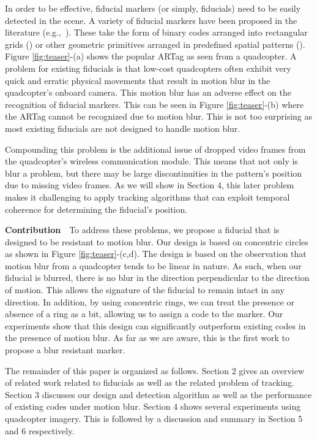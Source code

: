 \documentclass[10pt,twocolumn,letterpaper]{article}
\begin{document}
In order to be effective, fiducial markers (or simply, fiducials) need
to be easily detected in the scene. A variety of fiducial markers
have been proposed in the literature
(e.g.,~\cite{NaimarkF02,ARToolkit02,Fiala05,Pitag13,runetag11}).
These take the form of binary codes arranged into rectangular grids (\cite{ARToolkit02,Fiala05})
or other geometric primitives arranged in predefined spatial patterns
(\cite{NaimarkF02,Pitag13,runetag11}).
Figure \ref{fig:teaser}-(a) shows the popular ARTag \cite{Fiala05} as
seen from a quadcopter. A problem for existing fiducials is that low-cost quadcopters
often exhibit very quick and erratic physical movements that
result in motion blur in the quadcopter's onboard camera. This motion blur has
an adverse effect on the recognition of fiducial markers. This can be seen in
Figure \ref{fig:teaser}-(b) where the ARTag cannot be recognized due to motion
blur. This is not too surprising as most existing fiducials are not
designed to handle motion blur.

Compounding this problem is the additional issue of dropped video frames from
the quadcopter's wireless communication module. This means that not only is
blur a problem, but there may be large discontinuities in the pattern's
position due to missing video frames. As we will show in Section 4, this later problem
makes it challenging to apply tracking algorithms that can exploit temporal
coherence for determining the fiducial's position.

\noindent\textbf{Contribution}~~To address these problems, we propose a
fiducial that is designed to be resistant to motion blur. Our design is based on
concentric circles as shown in Figure \ref{fig:teaser}-(c,d). The design is based
on the observation that motion blur from a quadcopter tends to be linear in
nature. As such, when our fiducial is blurred, there is no blur in the direction
perpendicular to the direction of motion.  This allows the signature of the
fiducial to remain intact in any direction. In addition, by using concentric
rings, we can treat the presence or absence of a ring as a bit, allowing us to
assign a code to the marker. Our experiments show that this design can
significantly outperform existing codes in the presence of motion blur. As far
as we are aware, this is the first work to propose a blur resistant marker.

The remainder of this paper is organized as follows.  Section 2 gives an
overview of related work related to fiducials as well as the related problem of
tracking. Section 3 discusses our design and detection algorithm as well as
the performance of existing codes under motion blur. Section 4 shows several
experiments using quadcopter imagery. This is followed by a discussion and
summary in Section 5 and 6 respectively.
\end{document}
